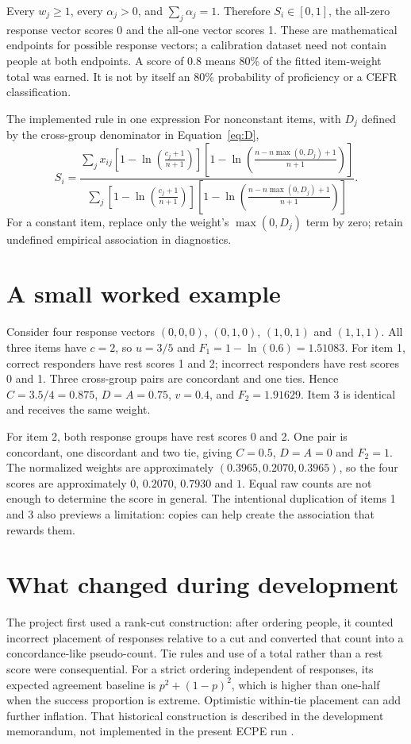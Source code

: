\documentclass[11pt,a4paper,oneside,headings=normal,parskip=half]{scrreprt}
\begin{document}
Every $w_j\ge1$, every $\alpha_j>0$, and $\sum_j\alpha_j=1$. Therefore $S_i\in[0,1]$, the all-zero response vector scores 0 and the all-one vector scores 1. These are mathematical endpoints for possible response vectors; a calibration dataset need not contain people at both endpoints. A score of 0.8 means 80\% of the fitted item-weight total was earned. It is not by itself an 80\% probability of proficiency or a CEFR classification.

\begin{finding}{The implemented rule in one expression}
For nonconstant items, with $D_j$ defined by the cross-group denominator in Equation~\eqref{eq:D},
\[
S_i=\frac{\displaystyle\sum_jx_{ij}
\left[1-\ln\!\left(\frac{c_j+1}{n+1}\right)\right]
\left[1-\ln\!\left(\frac{n-n\max(0,D_j)+1}{n+1}\right)\right]}
{\displaystyle\sum_j
\left[1-\ln\!\left(\frac{c_j+1}{n+1}\right)\right]
\left[1-\ln\!\left(\frac{n-n\max(0,D_j)+1}{n+1}\right)\right]}.
\]
For a constant item, replace only the weight's $\max(0,D_j)$ term by zero; retain undefined empirical association in diagnostics.
\end{finding}

\section{A small worked example}
Consider four response vectors $(0,0,0)$, $(0,1,0)$, $(1,0,1)$ and $(1,1,1)$. All three items have $c=2$, so $u=3/5$ and $F_1=1-\ln(0.6)=1.51083$. For item 1, correct responders have rest scores 1 and 2; incorrect responders have rest scores 0 and 1. Three cross-group pairs are concordant and one ties. Hence $C=3.5/4=0.875$, $D=A=0.75$, $v=0.4$, and $F_2=1.91629$. Item 3 is identical and receives the same weight.

For item 2, both response groups have rest scores 0 and 2. One pair is concordant, one discordant and two tie, giving $C=0.5$, $D=A=0$ and $F_2=1$. The normalized weights are approximately $(0.3965,0.2070,0.3965)$, so the four scores are approximately $0$, $0.2070$, $0.7930$ and $1$. Equal raw counts are not enough to determine the score in general. The intentional duplication of items 1 and 3 also previews a limitation: copies can help create the association that rewards them.

\section{What changed during development}
The project first used a rank-cut construction: after ordering people, it counted incorrect placement of responses relative to a cut and converted that count into a concordance-like pseudo-count. Tie rules and use of a total rather than a rest score were consequential. For a strict ordering independent of responses, its expected agreement baseline is $p^2+(1-p)^2$, which is higher than one-half when the success proportion is extreme. Optimistic within-tie placement can add further inflation. That historical construction is described in the development memorandum, not implemented in the present ECPE run \citep{development}.
\end{document}
